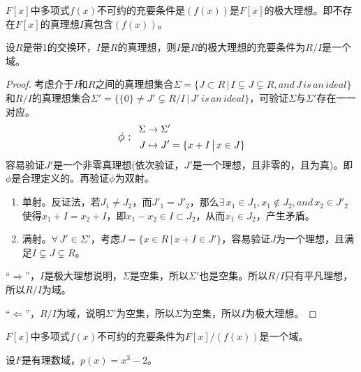 \begin{lemma}
	$F[x]$中多项式$f(x)$不可约的充要条件是$(f(x))$是$F[x]$的极大理想。即不存在$F[x]$的真理想$I$真包含$(f(x))$。
\end{lemma}

\begin{lemma}
	设$R$是带1的交换环，$I$是$R$的真理想，则$I$是$R$的极大理想的充要条件为$R/I$是一个域。
\end{lemma}

\begin{proof}
	考虑介于$I$和$R$之间的真理想集合$\Sigma=\{J\subset R\, \big| \, I\subsetneq J \subsetneq R ,and \, J \, is \, an \, ideal \}$
	和$R/I$的真理想集合$\Sigma'=\{\{0\}\neq J' \subsetneq R/I \, \big| \, J' \, is \, an \, ideal \}$，可验证$\Sigma$与$\Sigma'$存在一一对应。
	\begin{equation*}
		\text{\large$\phi:$\,\, }
		\begin{aligned}
			\Sigma&\rightarrow\Sigma'\\
			J&\mapsto J'=\{x+I \, \big| \, x\in J \}
		\end{aligned}
	\end{equation*}
	容易验证$J'$是一个非零真理想(依次验证，$J'$是一个理想，且非零的，且为真)。即$\phi$是合理定义的。再验证$\phi$为双射。
	\begin{enumerate}
		\item 单射。反证法，若$J_{1}\neq J_{2}$，而$J'_{1}=J'_{2}$，那么$\exists \, x_{1}\in J_{1},x_{1}\not\in J_{2},and \, x_{2}\in J'_{2}$使得$x_{1}+I=x_{2}+I $，即$ x_{1}-x_{2}\in I\subset J_{2}$，从而$x_{1}\in J_{2}$，产生矛盾。
		\item 满射。$\forall \, J'\in \Sigma' $，考虑$J=\{x\in R\,\big| \, x+I\in J'\}$，容易验证$J$为一个理想，且满足$I\subsetneq J\subsetneq R$。
	\end{enumerate}
	\par
	“$\Rightarrow$”，$I$是极大理想说明，$\Sigma$是空集，所以$\Sigma'$也是空集。所以$R/I$只有平凡理想，所以$R/I$为域。
	\par
	“$\Leftarrow$”，$R/I$为域，说明$\Sigma'$为空集，所以$\Sigma$为空集，所以$I$为极大理想。
\end{proof}

\begin{corollary}
	$F[x]$中多项式$f(x)$不可约的充要条件为$F[x]/(f(x))$是一个域。
\end{corollary}

\begin{example}
	设$F$是有理数域，$p(x)=x^{3}-2$。
\end{example}

